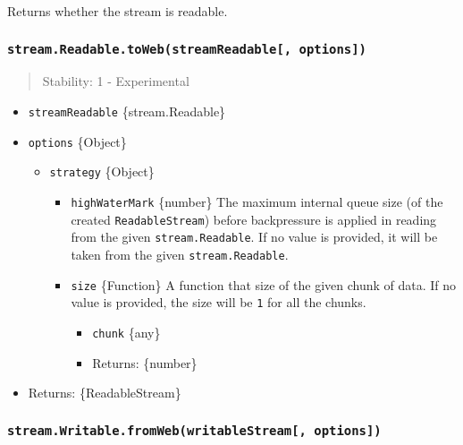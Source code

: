 Returns whether the stream is readable.

\subsubsection{\texorpdfstring{\texttt{stream.Readable.toWeb(streamReadable{[},\ options{]})}}{stream.Readable.toWeb(streamReadable{[}, options{]})}}\label{stream.readable.towebstreamreadable-options}

\begin{quote}
Stability: 1 - Experimental
\end{quote}

\begin{itemize}
\tightlist
\item
  \texttt{streamReadable} \{stream.Readable\}
\item
  \texttt{options} \{Object\}

  \begin{itemize}
  \tightlist
  \item
    \texttt{strategy} \{Object\}

    \begin{itemize}
    \tightlist
    \item
      \texttt{highWaterMark} \{number\} The maximum internal queue size
      (of the created \texttt{ReadableStream}) before backpressure is
      applied in reading from the given \texttt{stream.Readable}. If no
      value is provided, it will be taken from the given
      \texttt{stream.Readable}.
    \item
      \texttt{size} \{Function\} A function that size of the given chunk
      of data. If no value is provided, the size will be \texttt{1} for
      all the chunks.

      \begin{itemize}
      \tightlist
      \item
        \texttt{chunk} \{any\}
      \item
        Returns: \{number\}
      \end{itemize}
    \end{itemize}
  \end{itemize}
\item
  Returns: \{ReadableStream\}
\end{itemize}

\subsubsection{\texorpdfstring{\texttt{stream.Writable.fromWeb(writableStream{[},\ options{]})}}{stream.Writable.fromWeb(writableStream{[}, options{]})}}\label{stream.writable.fromwebwritablestream-options}

